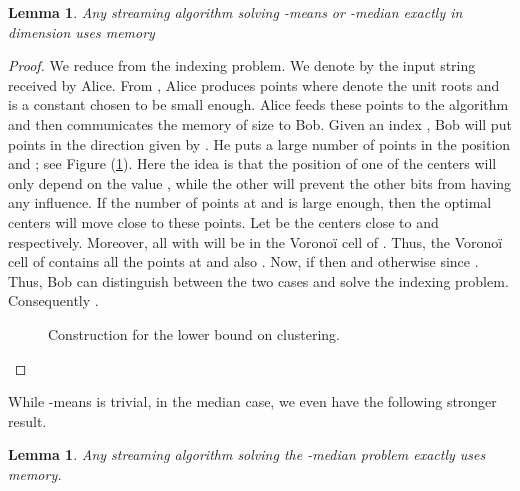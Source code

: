 \documentclass[a4paper,11pt,oneside,english,onecolumn]{article}
\newtheorem{lemma}[theorem]{Lemma}
\theoremstyle{definition}
\begin{document}
\begin{lemma}
\label{lower:exact}
Any streaming algorithm solving -means or -median exactly in dimension  uses  memory
\end{lemma}
\begin{proof}
We reduce from the indexing problem. We denote by  the input string received by Alice. From , Alice produces  points  where  denote the  unit roots and  is a constant chosen to be small enough. Alice feeds these points to the algorithm and then communicates the memory of size  to Bob. Given an index , Bob will put points in the direction given by . He puts a large number of points in the position  and ; see Figure (\ref{figure:lowerBoundClustering}). Here the idea is that the position of one of the centers will only depend on the value , while the other will prevent the other bits from having any influence. If the number of points at  and  is large enough, then the optimal centers will move close to these points. Let  be the centers close to  and  respectively. Moreover, all  with  will be in the Vorono\"i cell of . Thus, the Vorono\"i cell of  contains all the points at  and also . Now, if  then  and otherwise  since . Thus, Bob can distinguish between the two cases and solve the indexing problem. Consequently .
\begin{figure}
\center
{}
\caption{Construction for the lower bound on clustering.
}
\label{figure:lowerBoundClustering}
\end{figure}
\end{proof}


While -means is trivial, in the median case, we even have the following stronger result.
\begin{lemma}
\label{lemma:1median}
Any streaming algorithm solving the -median problem exactly uses  memory.
\end{lemma}
\end{document}
